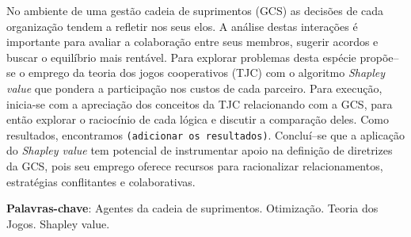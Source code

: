\documentclass[
	article,			        %
	11pt,				          %
	oneside,			        %
	a4paper,			        %
	english,			        %
	brazil,				        %
	sumario=tradicional
]{abntex2}\usepackage[]{graphicx}\usepackage[]{color}
\author{João B. G. Brito, \emph{Esp.}   \\   
    \href{mailto:jbgb@uol.com.br}{jbgb@uol.com.br} 
  \and {Michel J. Anzanello, \emph{Phd}} \\
    \href{mailto:michel.anzanello@gmail.com}{michel.anzanello@gmail.com}
}
\date{\today}
\begin{document}

\frenchspacing 


%
%
\maketitle


\begin{resumoumacoluna}
No ambiente de uma gestão cadeia de suprimentos (GCS) as decisões de cada organização tendem a refletir nos seus elos. A análise destas interações é importante para avaliar a colaboração entre seus membros, sugerir acordos e buscar o equilíbrio mais rentável. Para explorar problemas desta espécie propõe--se o emprego da teoria dos jogos cooperativos (TJC) com o algoritmo \emph{Shapley value} que pondera a participação nos custos de cada parceiro. Para execução, inicia-se com a apreciação dos conceitos da TJC relacionando com a GCS, para então explorar o raciocínio de cada lógica e discutir a comparação deles. Como resultados, encontramos \texttt{(adicionar os resultados)}. Concluí--se que a aplicação do \emph{Shapley value} tem potencial de instrumentar apoio na definição de diretrizes da GCS, pois seu emprego oferece recursos para racionalizar relacionamentos, estratégias conflitantes e colaborativas.

 \vspace{\onelineskip}
 
 \noindent
 \textbf{Palavras-chave}: Agentes da cadeia de suprimentos. Otimização. Teoria dos Jogos. Shapley value.
\end{resumoumacoluna}


\textual

\end{document}
